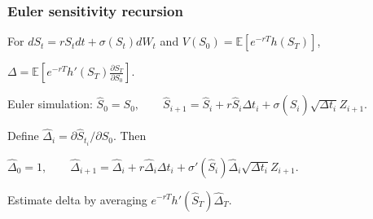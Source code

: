 \subsubsection*{Euler sensitivity recursion}

For $dS_t=rS_tdt+\sigma(S_t)dW_t$ and $V(S_0)=\mathbb{E}[e^{-rT}h(S_T)]$,

$\Delta=\mathbb{E}\left[e^{-rT}h'(S_T)\frac{\partial S_T}{\partial S_0}\right]$.

Euler simulation:
$\hat S_0=S_0,\qquad \hat S_{i+1}=\hat S_i+r\hat S_i\Delta t_i+\sigma(\hat S_i)\sqrt{\Delta t_i}Z_{i+1}$.

Define $\hat\Delta_i=\partial\hat S_{t_i}/\partial S_0$. Then

$\hat\Delta_0=1,\qquad \hat\Delta_{i+1}=\hat\Delta_i+r\hat\Delta_i\Delta t_i+\sigma'(\hat S_i)\hat\Delta_i\sqrt{\Delta t_i}Z_{i+1}$.

Estimate delta by averaging $e^{-rT}h'(\hat S_T)\hat\Delta_T$.

